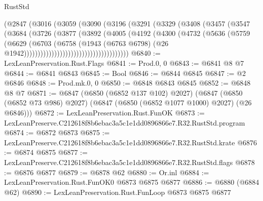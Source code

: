 \begin{lexlean}{RustStd}
\begin{coremodule}
                              (@2847
                                (@3016
                                  (@3059
                                    (@3090
                                      (@3196
                                        (@3291
                                          (@3329
                                            (@3408
                                              (@3457
                                                (@3547
                                                  (@3684
                                                    (@3726
                                                      (@3877
                                                        (@3892
                                                          (@4005
                                                            (@4192
                                                              (@4300
                                                                (@4732
                                                                  (@5636
                                                                    (@5759
                                                                      (@6629
                                                                        (@6703
                                                                          (@6758
                                                                            (@1943
                                                                              (@6763 @6798)
                                                                              (@26
                                                                                @1942))))))))))))))))))))))))))))))))))))))
@6840 := LexLeanPreservation.Rust.Flags
@6841 := Prod.{0, 0}
@6843 := @6841 @8 @7
@6844 := @6841 @6843
@6845 := Bool
@6846 := @6844 @6845
@6847 := @2 @6846
@6848 := Prod.mk.{0, 0}
@6850 := @6848 @6843 @6845
@6852 := @6848 @8 @7
@6871 := @6847
    (@6850 (@6852 @137 @102) @2027)
    (@6847 (@6850 (@6852 @73 @986) @2027) (@6847 (@6850 (@6852 @1077 @1000) @2027) (@26 @6846)))
@6872 := LexLeanPreservation.Rust.FunOK
@6873 := LexLeanPreserve.C212618f8b6ebac3a5c1e1dd0896866e7.R32.RustStd.program
@6874 := @6872 @6873
@6875 := LexLeanPreserve.C212618f8b6ebac3a5c1e1dd0896866e7.R32.RustStd.krate
@6876 := @6874 @6875
@6877 := LexLeanPreserve.C212618f8b6ebac3a5c1e1dd0896866e7.R32.RustStd.flags
@6878 := @6876 @6877
@6879 := @6878 @62
@6880 := Or.inl
@6884 := LexLeanPreservation.Rust.FunOK0 @6873 @6875 @6877
@6886 := @6880 (@6884 @62)
@6890 := LexLeanPreservation.Rust.FunLoop @6873 @6875 @6877

\end{coremodule}
\end{lexlean}
